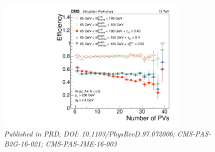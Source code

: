 \begin{figure}[h!]
    \centering
     \vspace*{10mm}
    \includegraphics[height=6.5cm]{figures/vtagging/JME-16-003/BoostedW/WtagSigEffvsNPV.pdf}
    \vspace*{10mm}
    \caption*{\footnotesize{\textit{Published in PRD, DOI: 10.1103/PhysRevD.97.072006; CMS-PAS-B2G-16-021; CMS-PAS-JME-16-003}}}
\end{figure}
\vspace*{\fill}

\clearpage

\clearpage

